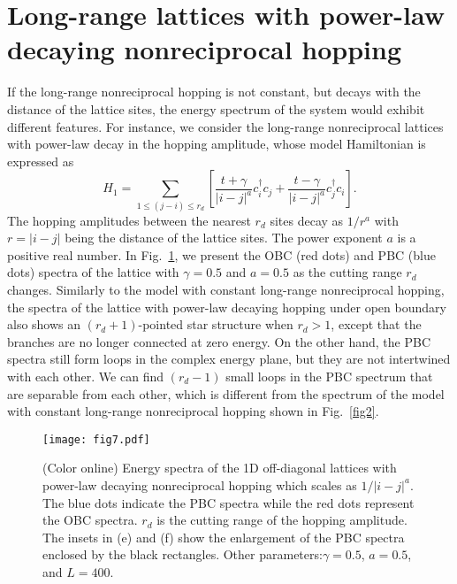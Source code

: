 \documentclass[prb,aps,twocolumn,showpacs]{revtex4-2} %
\begin{document}
\section{Long-range lattices with power-law decaying nonreciprocal hopping}\label{sect5}
If the long-range nonreciprocal hopping is not constant, but decays with the distance of the lattice sites, the energy spectrum of the system would exhibit different features. For instance, we consider the long-range nonreciprocal lattices with power-law decay in the hopping amplitude, whose model Hamiltonian is expressed as 
\begin{equation}
	H_1 = \sum_{1 \leq (j-i) \leq r_d} \left[ \frac{t+\gamma}{|i-j|^a} c_i^\dagger c_j + \frac{t-\gamma}{|i-j|^a} c_j^\dagger c_i \right].
\end{equation}
The hopping amplitudes between the nearest $r_d$ sites decay as $1/r^a$ with $r=|i-j|$ being the distance of the lattice sites. The power exponent $a$ is a positive real number. In Fig.~\ref{fig7}, we present the OBC (red dots) and PBC (blue dots) spectra of the lattice with $\gamma=0.5$ and $a=0.5$ as the cutting range $r_d$ changes. Similarly to the model with constant long-range nonreciprocal hopping, the spectra of the lattice with power-law decaying hopping under open boundary also shows an $(r_d+1)$-pointed star structure when $r_d>1$, except that the branches are no longer connected at zero energy. On the other hand, the PBC spectra still form loops in the complex energy plane, but they are not intertwined with each other. We can find  $(r_d-1)$ small loops in the PBC spectrum that are separable from each other, which is different from the spectrum of the model with constant long-range nonreciprocal hopping shown in Fig.~\ref{fig2}. 
\begin{figure}[t]
	\texttt{[image: fig7.pdf]}
	\caption{(Color online) Energy spectra of the 1D off-diagonal lattices with power-law decaying nonreciprocal hopping which scales as $1/|i-j|^a$. The blue dots indicate the PBC spectra while the red dots represent the OBC spectra. $r_d$ is the cutting range of the hopping amplitude. The insets in (e) and (f) show the enlargement of the PBC spectra enclosed by the black rectangles. Other parameters:$\gamma=0.5$, $a=0.5$, and $L=400$.}
	\label{fig7}
\end{figure}
\end{document}

